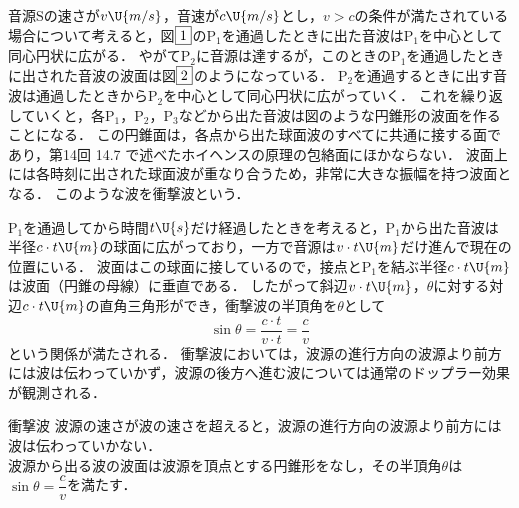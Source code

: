 音源$\mathrm{S}$の速さが$v\U{m/s}$，音速が$c\U{m/s}$とし，$v>c$の条件が満たされている場合について考えると，図$\fbox{1}$の$\mathrm{P_1}$を通過したときに出た音波は$\mathrm{P_1}$を中心として同心円状に広がる．
やがて$\mathrm{P_2}$に音源は達するが，このときの$\mathrm{P_1}$を通過したときに出された音波の波面は図$\fbox{2}$のようになっている．
$\mathrm{P_2}$を通過するときに出す音波は通過したときから$\mathrm{P_2}$を中心として同心円状に広がっていく．
これを繰り返していくと，各$\mathrm{P_1}$，$\mathrm{P_2}$，$\mathrm{P_3}$などから出た音波は図のような円錐形の波面を作ることになる．
この円錐面は，各点から出た球面波のすべてに共通に接する面であり，第14回 14.7 で述べたホイヘンスの原理の{\gtfamily 包絡面}にほかならない．
波面上には各時刻に出された球面波が重なり合うため，非常に大きな振幅を持つ波面となる．
このような波を{\gtfamily 衝撃波}という．

$\mathrm{P_1}$を通過してから時間$t\U{s}$だけ経過したときを考えると，$\mathrm{P_1}$から出た音波は半径$c\cdot t\U{m}$の球面に広がっており，一方で音源は$v\cdot t\U{m}$だけ進んで現在の位置にいる．
波面はこの球面に接しているので，接点と$\mathrm{P_1}$を結ぶ半径$c\cdot t\U{m}$は{\gtfamily 波面（円錐の母線）に垂直}である．
したがって斜辺$v\cdot t\U{m}$，$\theta$に対する対辺$c\cdot t\U{m}$の直角三角形ができ，衝撃波の半頂角を$\theta$として
\[\sin\theta=\frac{c\cdot t}{v\cdot t}=\frac{c}{v}\]
という関係が満たされる．
衝撃波においては，波源の進行方向の波源より前方には波は伝わっていかず，波源の後方へ進む波については通常のドップラー効果が観測される．

\begin{matome}{衝撃波}
\hspace{3mm} 波源の速さが波の速さを超えると，波源の進行方向の波源より前方には波は伝わっていかない．\\
\hspace{3mm} 波源から出る波の波面は波源を頂点とする円錐形をなし，その半頂角$\theta$は$\sin\theta=\dfrac{c}{v}$を満たす．
\end{matome}


\newpage

\setcounter{qno}{28}

\filbreak
{}


